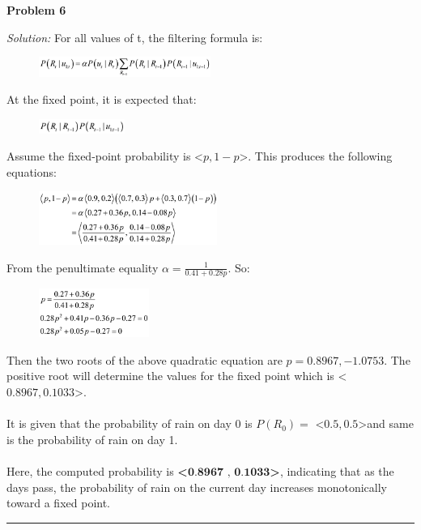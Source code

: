 \documentclass[a4paper, 11pt]{article}
\newenvironment{problem}[2][Problem]
    { \begin{mdframed}[backgroundcolor=gray!20] \textbf{#1 #2} \\}
    {  \end{mdframed}}
\newenvironment{solution}
    {\textit{Solution:}}
    {}
\begin{document}
{\begin{problem}{6}
\end{problem}
\begin{solution}
For all values of t, the filtering formula is:
\begin{figure}[H]
	\centering
	\includegraphics[width=0.5\textwidth]{6-1.png}
\end{figure}
At the fixed point, it is expected that:
\begin{figure}[H]
	\centering
	\includegraphics[width=0.25\textwidth]{6-2.png}
\end{figure}
Assume the fixed-point probability is <$p , 1-p$>. This produces the following equations:
\begin{figure}[H]
	\centering
	\includegraphics[width=0.52\textwidth]{6-3.png}
\end{figure}
From the penultimate equality $\alpha = \frac{1}{0.41 + 0.28p}.$ So:
\begin{figure}[H]
	\centering
	\includegraphics[width=0.32\textwidth]{6-4.png}
\end{figure}
Then the two roots of the above quadratic equation are $p=0.8967, -1.0753$. The positive root will determine the values for the fixed point which is <$0.8967 , 0.1033$>.\\ \\
It is given that the probability of rain on day 0 is $P(R_0) = $ <$0.5 , 0.5$>and same is the probability of rain on day 1. \\ \\
Here, the computed probability is \textbf{<$\textbf{0.8967 , 0.1033}$>}, indicating that as the days pass, the probability of rain on the current day increases monotonically toward a fixed point.
\end{solution}
\\\noindent\rule{7in}{2.8pt}
\pagebreak
\end{document}
